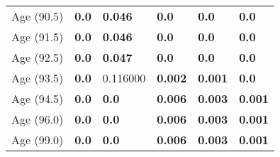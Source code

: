 \begin{tabular}{llllll}
Age (90.5) & \textbf{0.0} & \textbf{0.046} & \textbf{0.0} & \textbf{0.0} & \textbf{0.0} \\
Age (91.5) & \textbf{0.0} & \textbf{0.046} & \textbf{0.0} & \textbf{0.0} & \textbf{0.0} \\
Age (92.5) & \textbf{0.0} & \textbf{0.047} & \textbf{0.0} & \textbf{0.0} & \textbf{0.0} \\
Age (93.5) & \textbf{0.0} & 0.116000 & \textbf{0.002} & \textbf{0.001} & \textbf{0.0} \\
Age (94.5) & \textbf{0.0} & \textbf{0.0} & \textbf{0.006} & \textbf{0.003} & \textbf{0.001} \\
Age (96.0) & \textbf{0.0} & \textbf{0.0} & \textbf{0.006} & \textbf{0.003} & \textbf{0.001} \\
Age (99.0) & \textbf{0.0} & \textbf{0.0} & \textbf{0.006} & \textbf{0.003} & \textbf{0.001} \\
\bottomrule
\end{tabular}
